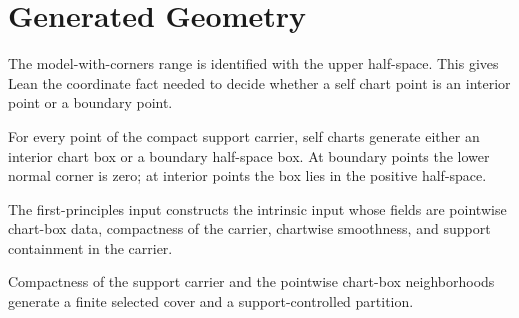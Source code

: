 \section{Generated Geometry}
\label{sec:generated_geometry}

\begin{definition}
  \label{def:halfspace_model}
  \leanok
  The model-with-corners range is identified with the upper half-space.  This
  gives Lean the coordinate fact needed to decide whether a self chart point is
  an interior point or a boundary point.
\end{definition}

\begin{theorem}
  \label{thm:pointwise_boxes_from_halfspace_model}
  \leanok
  For every point of the compact support carrier, self charts generate either
  an interior chart box or a boundary half-space box.  At boundary points the
  lower normal corner is zero; at interior points the box lies in the positive
  half-space.
\end{theorem}

\begin{definition}
  \label{def:intrinsic_input_from_first_principles}
  \leanok
  The first-principles input constructs the intrinsic input whose fields are
  pointwise chart-box data, compactness of the carrier, chartwise smoothness,
  and support containment in the carrier.
\end{definition}

\begin{definition}
  \label{def:open_selected_cover_partition}
  \leanok
  Compactness of the support carrier and the pointwise chart-box neighborhoods
  generate a finite selected cover and a support-controlled partition.
\end{definition}

